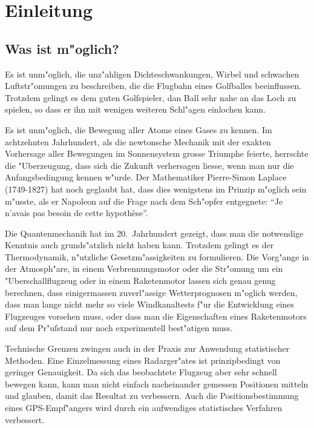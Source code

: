 %
%
\chapter*{Einleitung}
\section*{Was ist m"oglich?}
Es ist unm"oglich, die unz"ahligen Dichteschwankungen, Wirbel und
schwachen Luftstr"omungen zu beschreiben, die die Flugbahn eines
Golfballes beeinflussen. Trotzdem gelingt es dem guten Golfspieler,
dan Ball sehr nahe an das Loch zu spielen, so dass er ihn mit wenigen
weiteren Schl"agen einlochen kann.

Es ist unm"oglich, die Bewegung aller Atome eines Gases zu kennen.
Im achtzehnten Jahrhundert, als die newtonsche Mechanik mit der
exakten Vorhersage aller Bewegungen im Sonnensystem grosse Triumphe
feierte, herrschte die "Uberzeugung, dass sich die Zukunft verhersagen
liesse, wenn man nur die Anfangsbedingung kennen w"urde.
Der Mathematiker Pierre-Simon Laplace (1749-1827) hat noch geglaubt hat, dass dies
wenigstens im Prinzip m"oglich sein m"usste, als er Napoleon auf die Frage
nach dem Sch"opfer entgegnete: ``Je n'avais pas besoin de cette hypoth\`ese''.

Die Quantenmechanik hat
im 20.~Jahrhundert gezeigt, dass man die notwendige Kenntnis auch
grunds"atzlich nicht haben kann. Trotzdem gelingt es der Thermodynamik,
n"utzliche Gesetzm"assigkeiten zu formulieren. Die
Vorg"ange in der Atmosph"are, in einem Verbrennungsmotor oder die
Str"omung um ein "Uberschallflugzeug oder in einem Raketenmotor
lassen sich genau genug berechnen, dass einigermassen zuverl"assige
Wetterprognosen m"oglich werden, dass man lange nicht mehr so viele
Windkanaltests f"ur die Entwicklung eines Flugzeuges vorsehen muss,
oder dass man die Eigenschaften eines Raketenmotors auf dem
Pr"ufstand nur noch experimentell best"atigen muss.

Technische Grenzen zwingen auch in der Praxis zur Anwendung statistischer
Methoden. Eine Einzelmessung eines Radarger"ates ist prinzipbedingt
von geringer
Genauigkeit. Da sich das beobachtete Flugzeug aber sehr schnell bewegen
kann, kann man nicht einfach nacheinander gemessen Positionen mitteln
und glauben, damit das Resultat zu verbessern. Auch die Positionsbestimmung
eines GPS-Empf"angers wird durch ein aufwendiges statistisches Verfahren
verbessert.

